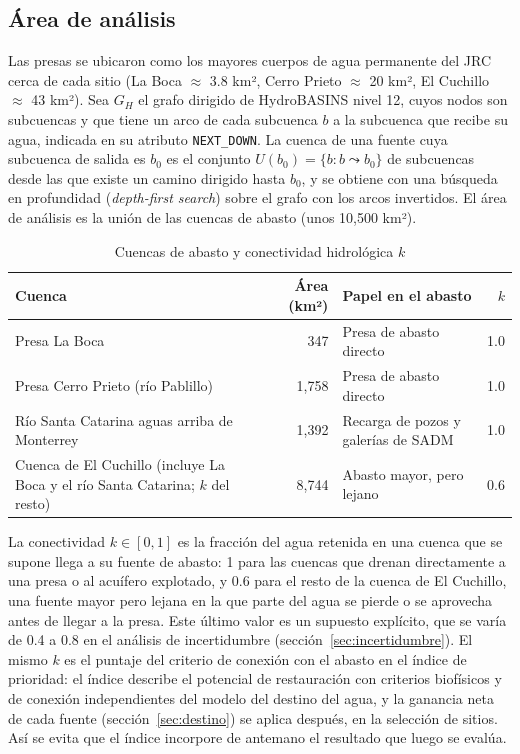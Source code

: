 \documentclass[11pt,letterpaper]{article}
\begin{document}
\subsection{Área de análisis}

Las presas se ubicaron como los mayores cuerpos de agua permanente del JRC cerca de cada sitio (La Boca $\approx$ 3.8 km², Cerro Prieto $\approx$ 20 km², El Cuchillo $\approx$ 43 km²). Sea $G_H$ el grafo dirigido de HydroBASINS nivel 12, cuyos nodos son subcuencas y que tiene un arco de cada subcuenca $b$ a la subcuenca que recibe su agua, indicada en su atributo \texttt{NEXT\_DOWN}. La cuenca de una fuente cuya subcuenca de salida es $b_0$ es el conjunto $U(b_0) = \{b : b \leadsto b_0\}$ de subcuencas desde las que existe un camino dirigido hasta $b_0$, y se obtiene con una búsqueda en profundidad (\emph{depth-first search}) sobre el grafo con los arcos invertidos. El área de análisis es la unión de las cuencas de abasto (unos 10,500 km²).

\begin{table}[H]\centering\small
\caption{Cuencas de abasto y conectividad hidrológica $k$}\label{tab:cuencas}
\begin{tabularx}{\linewidth}{Xrlr}
\toprule
Cuenca & Área (km²) & Papel en el abasto & $k$ \\
\midrule
Presa La Boca & 347 & Presa de abasto directo & 1.0 \\
Presa Cerro Prieto (río Pablillo) & 1,758 & Presa de abasto directo & 1.0 \\
Río Santa Catarina aguas arriba de Monterrey & 1,392 & Recarga de pozos y galerías de SADM & 1.0 \\
Cuenca de El Cuchillo (incluye La Boca y el río Santa Catarina; $k$ del resto) & 8,744 & Abasto mayor, pero lejano & 0.6 \\
\bottomrule
\end{tabularx}
\end{table}

La conectividad $k\in[0,1]$ es la fracción del agua retenida en una cuenca que se supone llega a su fuente de abasto: 1 para las cuencas que drenan directamente a una presa o al acuífero explotado, y 0.6 para el resto de la cuenca de El Cuchillo, una fuente mayor pero lejana en la que parte del agua se pierde o se aprovecha antes de llegar a la presa. Este último valor es un supuesto explícito, que se varía de 0.4 a 0.8 en el análisis de incertidumbre (sección~\ref{sec:incertidumbre}). El mismo $k$ es el puntaje del criterio de conexión con el abasto en el índice de prioridad: el índice describe el potencial de restauración con criterios biofísicos y de conexión independientes del modelo del destino del agua, y la ganancia neta de cada fuente (sección~\ref{sec:destino}) se aplica después, en la selección de sitios. Así se evita que el índice incorpore de antemano el resultado que luego se evalúa.
\end{document}
